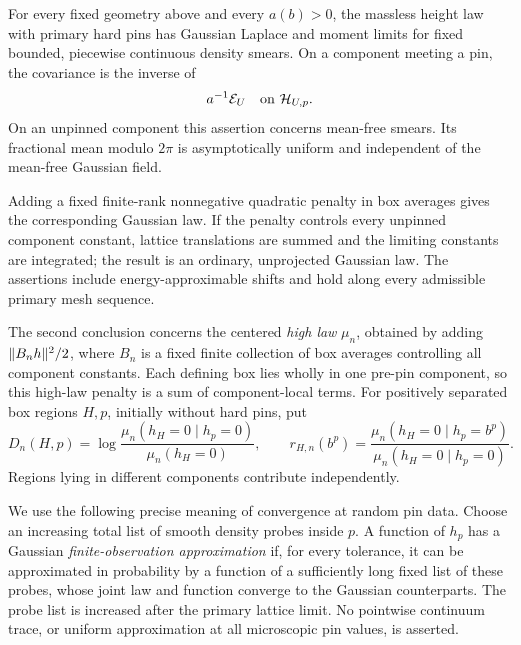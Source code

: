 \begin{theorem}\label{thm:mixed-limits}
For every fixed geometry above and every \(a(b)>0\), the massless
height law with primary hard pins has Gaussian Laplace and moment
limits for fixed bounded, piecewise continuous density smears.
On a component meeting a pin, the covariance is the inverse of
\[
                   a^{-1}\mathcal E_U
                   \quad\hbox{on }\mathcal H_{U,p}.
\]
On an unpinned component this assertion concerns mean-free smears.
Its fractional mean modulo \(2\pi\) is asymptotically uniform and
independent of the mean-free Gaussian field.

Adding a fixed finite-rank nonnegative quadratic penalty in box
averages gives the corresponding Gaussian law. If the penalty
controls every unpinned component constant, lattice translations
are summed and the limiting constants are integrated; the result
is an ordinary, unprojected Gaussian law. The assertions include
energy-approximable shifts and hold along every admissible primary
mesh sequence.
\end{theorem}

The second conclusion concerns the centered \emph{high law}
\(\mu_n\), obtained by adding
\(\lVert B_nh\rVert^2/2\), where \(B_n\) is a fixed finite collection of
box averages controlling all component constants. Each defining
box lies wholly in one pre-pin component, so this high-law
penalty is a sum of component-local terms. For positively
separated box regions \(H,p\), initially without hard pins, put
\begin{equation}
 D_n(H,p)=\log
 \frac{\mu_n(h_H=0\mid h_p=0)}{\mu_n(h_H=0)},\qquad
 r_{H,n}(b^p)=
 \frac{\mu_n(h_H=0\mid h_p=b^p)}
      {\mu_n(h_H=0\mid h_p=0)}.
 \label{eq:pins-definitions}
\end{equation}
Regions lying in different components contribute independently.

We use the following precise meaning of convergence at random pin
data. Choose an increasing total list of smooth density probes
inside \(p\). A function of \(h_p\) has a Gaussian
\emph{finite-observation approximation} if, for every tolerance,
it can be approximated in probability by a function of a
sufficiently long fixed list of these probes, whose joint law and
function converge to the Gaussian counterparts. The probe list is
increased after the primary lattice limit. No pointwise continuum
trace, or uniform approximation at all microscopic pin values, is
asserted.

